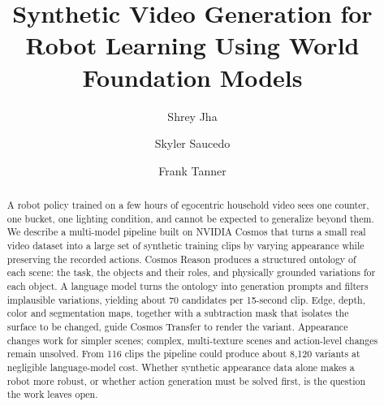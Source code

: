 \documentclass[runningheads]{llncs}
\begin{document}
\title{Synthetic Video Generation for Robot Learning Using World Foundation Models}

\author{Shrey Jha \and Skyler Saucedo \and Frank Tanner}

\maketitle

\begin{abstract}
A robot policy trained on a few hours of egocentric household video sees one counter, one bucket, one lighting condition, and cannot be expected to generalize beyond them. We describe a multi-model pipeline built on NVIDIA Cosmos that turns a small real video dataset into a large set of synthetic training clips by varying appearance while preserving the recorded actions. Cosmos Reason produces a structured ontology of each scene: the task, the objects and their roles, and physically grounded variations for each object. A language model turns the ontology into generation prompts and filters implausible variations, yielding about 70 candidates per 15-second clip. Edge, depth, color and segmentation maps, together with a subtraction mask that isolates the surface to be changed, guide Cosmos Transfer to render the variant. Appearance changes work for simpler scenes; complex, multi-texture scenes and action-level changes remain unsolved. From 116 clips the pipeline could produce about 8,120 variants at negligible language-model cost. Whether synthetic appearance data alone makes a robot more robust, or whether action generation must be solved first, is the question the work leaves open.

\end{abstract}





\end{document}

